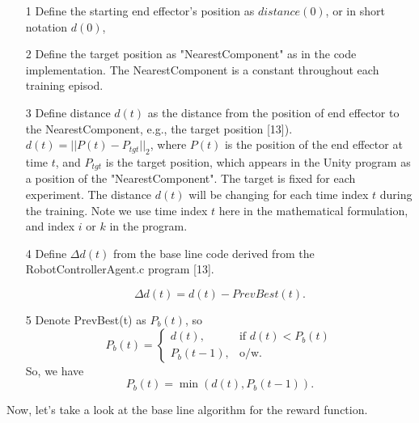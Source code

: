 \documentclass[conference]{IEEEtran}
\begin{document}
\begin{itemize}
\item[1] Define the starting end effector's position as
$distance(0)$, or in short notation $d(0)$, 

\item[2] Define the target position as "NearestComponent"
as in the code implementation. The NearestComponent is 
a constant throughout each training episod. 

\item[3] Define distance $d(t)$ as the distance from 
the position of end effector to  
the NearestComponent, e.g., 
the target position [13]). 
$d(t) = || P(t) - P_{tgt} ||_2 $, 
where $P(t)$ is the position of 
the end effector at time $t$, and 
$P_{tgt}$ is the target position, which appears
in the Unity program as a position of 
the "NearestComponent". The target is fixed 
for each experiment. 
The distance $d(t)$ will be changing for each time 
index $t$ during the training. Note we use time
index $t$ here in the mathematical formulation, and 
index $i$ or $k$ in the program.
 
\item[4] Define $\Delta d(t)$ from the base line 
code derived from the 
RobotControllerAgent.c program [13]. 

\begin{equation}
\Delta d(t) = d(t) - PrevBest(t) . 
\end{equation}

\item[5] Denote PrevBest(t) as $P_b(t)$, so
\begin{equation}
P_b(t) = 
\begin{cases}
d(t) , & \text{if } d(t) < P_b(t) \\
P_b(t-1), & \text{o/w} .
\end{cases}
\label{eq:PrevBest(t)}
\end{equation}
So, we have 
\begin{equation}
P_b(t) = \min (d(t), P_b(t-1)) . 
\end{equation}
\end{itemize}

Now, let's take a look at the base line algorithm for the
reward function. 
\end{document}
